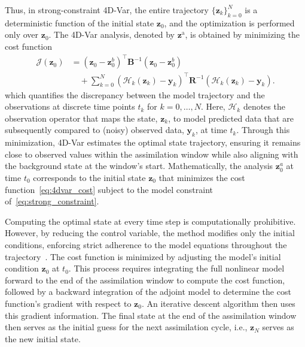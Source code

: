 \documentclass[final,1p,times]{elsarticle}
\begin{document}
Thus, in strong-constraint 4D-Var, the entire trajectory $\{\mathbf{z}_k\}_{k=0}^N$ is a deterministic function of the initial state $ \mathbf{z}_0 $, and the optimization is performed only over $\mathbf{z}_0$. 
The 4D-Var analysis, denoted by $\mathbf{z}^{\mathrm{a}}$, is obtained by minimizing the cost function
\begin{equation}
\begin{split}
    \mathcal{J}(\mathbf{z}_{0}) 
    &= \left(\mathbf{z}_{0}-\mathbf{z}_0^b\right)^{\top} 
       \mathbf{B}^{-1}\left(\mathbf{z}_{0}-\mathbf{z}_0^b\right) \\
    &\quad + \sum_{k=0}^{N} 
       \left(\mathcal{H}_k(\mathbf{z}_{k})-\mathbf{y}_k\right)^{\top} 
       \mathbf{R}^{-1}\left(\mathcal{H}_{k}(\mathbf{z}_{k})-\mathbf{y}_k\right). \label{eq:4dvar_cost}
\end{split}
\end{equation}
which quantifies the discrepancy between the model trajectory and the observations at discrete time points $ t_k $ for $ k = 0, \dots, N $.
Here, $\mathcal{H}_k$ denotes the observation operator that maps the state, $\mathbf{z}_k$, to model predicted data that are subsequently compared to (noisy) observed data, $\mathbf{y}_k$, at time $t_k$.
Through this minimization, 4D-Var estimates the optimal state trajectory, ensuring it remains close to observed values within the assimilation window while also aligning with the background state at the window’s start.
Mathematically, the analysis $ \mathbf{z}_{0}^a $ at time $ t_0 $ corresponds to the initial state $ \mathbf{z}_{0} $ that minimizes the cost function~\eqref{eq:4dvar_cost} subject to the model constraint of~\eqref{eq:strong_constraint}.


Computing the optimal state at every time step is computationally prohibitive. However, by reducing the control variable, the method modifies only the initial conditions, enforcing strict adherence to the model equations throughout the trajectory~\citep{Dimet1986}. 
The cost function is minimized by adjusting the model’s initial condition $ \mathbf{z}_{0} $ at $ t_{0} $. 
This process requires integrating the full nonlinear model forward to the end of the assimilation window to compute the cost function, followed by a backward integration of the adjoint model to determine the cost function’s gradient with respect to $ \mathbf{z}_{0} $. 
An iterative descent algorithm then uses this gradient information. 
The final state at the end of the assimilation window then serves as the initial guess for the next assimilation cycle, i.e., $\mathbf{z}_N$ serves as the new initial state.
\end{document}
